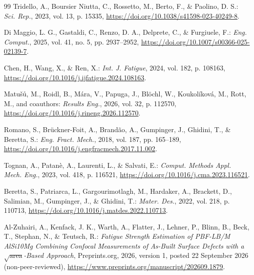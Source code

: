 \documentclass[12pt,a4paper]{article}
\begin{document}
\begin{thebibliography}{99}
Tridello, A., Boursier Niutta, C., Rossetto, M., Berto, F., \& Paolino, D. S.: \emph{Sci. Rep.}, 2023, vol. 13, p. 15335, \url{https://doi.org/10.1038/s41598-023-40249-8}.

Di Maggio, L. G., Gastaldi, C., Renzo, D. A., Delprete, C., \& Furgiuele, F.: \emph{Eng. Comput.}, 2025, vol. 41, no. 5, pp. 2937–2952, \url{https://doi.org/10.1007/s00366-025-02139-7}.

Chen, H., Wang, X., \& Ren, X.: \emph{Int. J. Fatigue}, 2024, vol. 182, p. 108163, \url{https://doi.org/10.1016/j.ijfatigue.2024.108163}.

Matušů, M., Roidl, B., Mára, V., Papuga, J., Blöchl, W., Koukolíková, M., Rott, M., and coauthors: \emph{Results Eng.}, 2026, vol. 32, p. 112570, \url{https://doi.org/10.1016/j.rineng.2026.112570}. %

Romano, S., Brückner-Foit, A., Brandão, A., Gumpinger, J., Ghidini, T., \& Beretta, S.: \emph{Eng. Fract. Mech.}, 2018, vol. 187, pp. 165–189, \url{https://doi.org/10.1016/j.engfracmech.2017.11.002}.

Tognan, A., Patanè, A., Laurenti, L., \& Salvati, E.: \emph{Comput. Methods Appl. Mech. Eng.}, 2023, vol. 418, p. 116521, \url{https://doi.org/10.1016/j.cma.2023.116521}.

Beretta, S., Patriarca, L., Gargourimotlagh, M., Hardaker, A., Brackett, D., Salimian, M., Gumpinger, J., \& Ghidini, T.: \emph{Mater. Des.}, 2022, vol. 218, p. 110713, \url{https://doi.org/10.1016/j.matdes.2022.110713}.

Al-Zuhairi, A., Kenfack, J. K., Warth, A., Flatter, J., Lehner, P., Blinn, B., Beck, T., Stephan, N., \& Teutsch, R.: \emph{Fatigue Strength Estimation of PBF-LB/M AlSi10Mg Combining Confocal Measurements of As-Built Surface Defects with a $\sqrt{\mathrm{area}}$-Based Approach}, Preprints.org, 2026, version 1, posted 22 September 2026 (non-peer-reviewed), \url{https://www.preprints.org/manuscript/202609.1879}.
\end{thebibliography}



\clearpage


\clearpage


\clearpage


\clearpage


\clearpage


\clearpage


\clearpage


\clearpage
\end{document}
